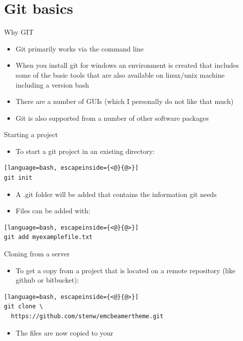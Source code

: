 \documentclass[12pt]{beamer}
\begin{document}
\section{Git basics}

\begin{frame}{Why GIT}
	\begin{itemize}	
      \item Git primarily works via the command line
      \item When you install git for windows an environment is created that includes some of the basic tools that are also available on linux/unix machine including a version \alert{bash}
      \item There are a number of GUIs (which I personally do not like that much)
      \item Git is also supported from a number of other software packages 
	\end{itemize}
\end{frame}



\begin{frame}[fragile]{Starting a project}
\begin{itemize}
\item To start a git project in an existing directory:
\end{itemize}
\begin{lstlisting}[language=bash, escapeinside={<@}{@>}]
git init
\end{lstlisting}
\begin{itemize}
	\item A .git folder will be added that contains the information git needs
\end{itemize}
\begin{itemize}
\item Files can be added with:
\end{itemize}
\begin{lstlisting}[language=bash, escapeinside={<@}{@>}]
git add myexamplefile.txt
\end{lstlisting}
\end{frame}

\begin{frame}[fragile]{Cloning from a server}
\begin{itemize}
\item To get a copy from a project that is located on a remote repository (like github or bitbucket):
\end{itemize}
\begin{lstlisting}[language=bash, escapeinside={<@}{@>}]
git clone \
  https://github.com/stenw/emcbeamertheme.git
\end{lstlisting}
\begin{itemize}
\item The files are now copied to your \textbf{}
\end{itemize}
\end{frame}
\end{document}
